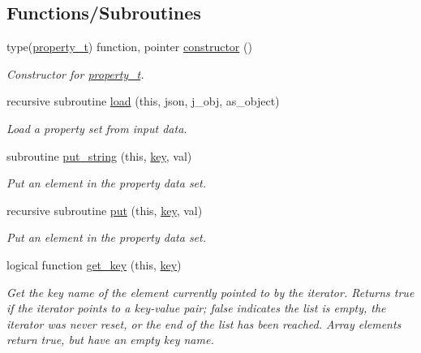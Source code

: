 \subsection*{Functions/\+Subroutines}
\begin{DoxyCompactItemize}
\item 
type(\mbox{\hyperlink{structpmc__property_1_1property__t}{property\+\_\+t}}) function, pointer \mbox{\hyperlink{namespacepmc__property_ac1691fe0d2b767ab79cb3d3e95e9ddba}{constructor}} ()
\begin{DoxyCompactList}\small\item\em Constructor for \mbox{\hyperlink{structpmc__property_1_1property__t}{property\+\_\+t}}. \end{DoxyCompactList}\item 
recursive subroutine \mbox{\hyperlink{namespacepmc__property_ad1b94310c9bc21b189955b8ceec4918a}{load}} (this, json, j\+\_\+obj, as\+\_\+object)
\begin{DoxyCompactList}\small\item\em Load a property set from input data. \end{DoxyCompactList}\item 
subroutine \mbox{\hyperlink{namespacepmc__property_a849e58df17633b82032774d0ee63d3c8}{put\+\_\+string}} (this, \mbox{\hyperlink{namespacepmc__property_a733aef8cbd02fbfed19bde913728678e}{key}}, val)
\begin{DoxyCompactList}\small\item\em Put an element in the property data set. \end{DoxyCompactList}\item 
recursive subroutine \mbox{\hyperlink{namespacepmc__property_a40b196afb48588fb6286649ae31b97b6}{put}} (this, \mbox{\hyperlink{namespacepmc__property_a733aef8cbd02fbfed19bde913728678e}{key}}, val)
\begin{DoxyCompactList}\small\item\em Put an element in the property data set. \end{DoxyCompactList}\item 
logical function \mbox{\hyperlink{namespacepmc__property_a7556849d2f132cb4b347a8840ee8434e}{get\+\_\+key}} (this, \mbox{\hyperlink{namespacepmc__property_a733aef8cbd02fbfed19bde913728678e}{key}})
\begin{DoxyCompactList}\small\item\em Get the key name of the element currently pointed to by the iterator. Returns true if the iterator points to a key-\/value pair; false indicates the list is empty, the iterator was never reset, or the end of the list has been reached. Array elements return true, but have an empty key name. \end{DoxyCompactList}\item 

\end{DoxyCompactItemize}
